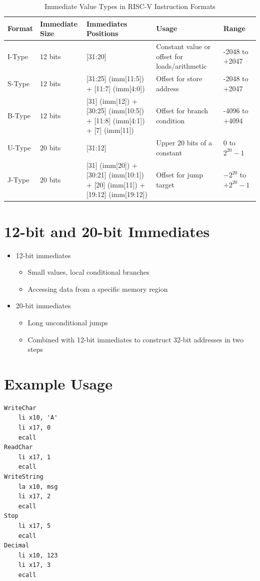 \documentclass{article}
\begin{document}
\begin{table}[h!]
    \centering
    \begin{tabular}{|p{1.5cm}|p{2cm}|p{5cm}|p{4cm}|p{3cm}|}
        \hline
        \textbf{Format} & \textbf{Immediate Size} & \textbf{Immediates Positions} & \textbf{Usage} & \textbf{Range} \\
        \hline
        I-Type & 12 bits & [31:20] & Constant value or offset for loads/arithmetic & -2048 to +2047 \\
        \hline
        S-Type & 12 bits & [31:25] (imm[11:5]) + [11:7] (imm[4:0]) & Offset for store address & -2048 to +2047 \\
        \hline
        B-Type & 12 bits & [31] (imm[12]) + [30:25] (imm[10:5]) + [11:8] (imm[4:1]) + [7] (imm[11]) & Offset for branch condition & -4096 to +4094 \\
        \hline
        U-Type & 20 bits & [31:12] & Upper 20 bits of a constant & 0 to $2^{20} - 1$ \\
        \hline
        J-Type & 20 bits & [31] (imm[20]) + [30:21] (imm[10:1]) + [20] (imm[11]) + [19:12] (imm[19:12]) & Offset for jump target & $-2^{20}$ to $+2^{20} - 1$ \\
        \hline
    \end{tabular}
    \caption{Immediate Value Types in RISC-V Instruction Formats}
\end{table}


\section*{12-bit and 20-bit Immediates}
\begin{itemize}
    \item 12-bit immediates
    \begin{itemize}
        \item Small values, local conditional branches
        \item Accessing data from a specific memory region
    \end{itemize}
    \item 20-bit immediates
    \begin{itemize}
        \item Long unconditional jumps
        \item Combined with 12-bit immediates to construct 32-bit addresses in two steps
    \end{itemize}
\end{itemize}

\section*{Example Usage}
\begin{verbatim}
WriteChar
    li x10, 'A'
    li x17, 0
    ecall
ReadChar
    li x17, 1
    ecall
WriteString
    la x10, msg
    li x17, 2
    ecall
Stop
    li x17, 5
    ecall
Decimal
    li x10, 123
    li x17, 3
    ecall
\end{verbatim}
\end{document}
